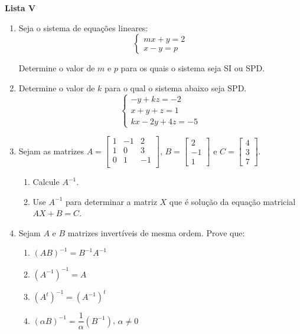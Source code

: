 \documentclass[12pt,a4paper]{article}
\begin{document}
\begin{center}
  \textbf{Lista V}
\end{center}

\begin{enumerate}
  \item Seja o sistema de equações lineares:
  $$
  \begin{cases}
    mx + y = 2 \\
    x - y = p
  \end{cases}
  $$

  Determine o valor de $m$ e $p$ para os quais o sistema seja SI ou SPD.
  
  \item Determine o valor de $k$ para o qual o sistema abaixo seja SPD.
  $$
  \begin{cases}
    -y + kz = -2 \\
    x + y + z = 1 \\
    kx -2y + 4z = -5
  \end{cases}
  $$
 
 \item Sejam as matrizes
 $A = \begin{bmatrix} 
 1 & - 1 & 2 \\
 1 & 0 & 3 \\
 0 & 1 & -1 \\
 \end{bmatrix}$,  
 $B = \begin{bmatrix} 2 \\ -1 \\ 1\end{bmatrix}$ e 
 $C = \begin{bmatrix} 4 \\ 3 \\ 7\end{bmatrix}$.
 
 \begin{enumerate}
   \item Calcule $A^{-1}$.
   \item Use $A^{-1}$ para determinar a matriz $X$ que é solução da equação
   matricial $AX + B = C$.
 \end{enumerate}
 
 \item Sejam $A$ e $B$ matrizes invertíveis de mesma ordem. Prove que:
 \begin{enumerate}
   \item $\left(AB\right)^{-1} = B^{-1}A^{-1}$
   \item $\left(A^{-1}\right)^{-1} = A$
   \item $\left(A^{t}\right)^{-1} = \left(A^{-1}\right)^{t}$
   \item $\left(\alpha B\right)^{-1} = \dfrac{1}{\alpha}\left(B^{-1}\right)$, $\alpha \neq 0$
 \end{enumerate}
 
\end{enumerate}
  
\end{document}
